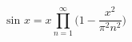    \begin{center}
        \begin{equation*}
            \text{sin }x = x \prod^{\infty}_{n=1}
            \bigg(1 - \frac{x^2}{\pi^{2} n^{2}} \bigg)
        \end{equation*}
    \end{center}

